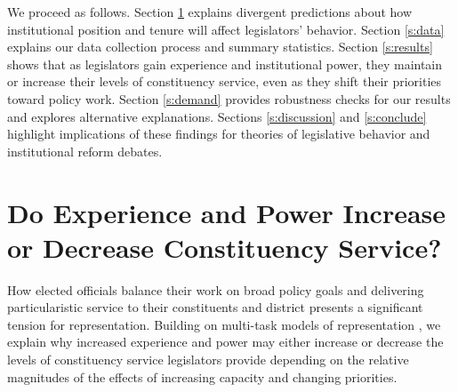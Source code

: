 \documentclass[12pt]{article}
\begin{document}
We proceed as follows. Section \ref{s:theory} explains divergent predictions about how institutional position and tenure will affect legislators' behavior. Section \ref{s:data} explains our data collection process and summary statistics. Section \ref{s:results} shows that as legislators gain experience and institutional power, they maintain or increase their levels of constituency service, even as they shift their priorities toward policy work. Section \ref{s:demand} provides robustness checks for our results and explores alternative explanations. Sections \ref{s:discussion} and \ref{s:conclude} highlight implications of these findings for theories of legislative behavior and institutional reform debates.


\section{Do Experience and Power Increase or Decrease Constituency Service?} \label{s:theory}

How elected officials balance their work on broad policy goals and delivering particularistic service to their constituents and district presents a significant tension for representation. %
Building on multi-task models of representation \citep{AshworthBuenodeMesquita2006, gordon2009advantages}, we explain why increased experience and power may either increase or decrease the levels of constituency service legislators provide depending on the relative magnitudes of the effects of increasing capacity and changing priorities.

\end{document}
